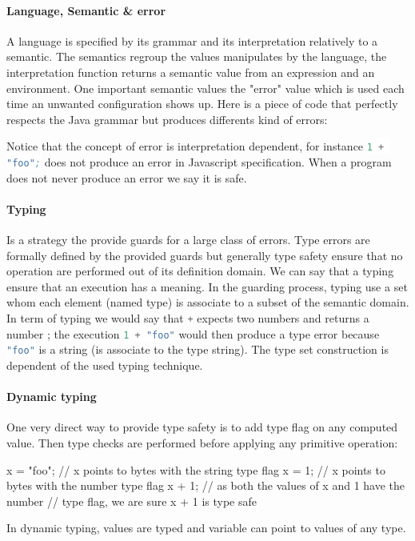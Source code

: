 \documentclass[a4paper]{report}
\newcommand{\icode}[1]{\colorbox{white}{\lstinline[language=scheme]&#1&}} %
\begin{document}
\paragraph{Language, Semantic \& error} A language is specified by its grammar and its interpretation relatively to a semantic. The semantics regroup the values manipulates by the language, the interpretation function returns a semantic value from an expression and an environment. One important semantic values the "error" value which is used each time an unwanted configuration shows up. Here is a piece of code that perfectly respects the Java grammar but produces differents kind of errors:

Notice that the concept of error is interpretation dependent, for instance \icode{1 + "foo";} does not produce an error in Javascript specification. When a program does not never produce an error we say it is safe.

\paragraph{Typing} Is a strategy the provide guards for a large class of errors. Type errors are formally defined by the provided guards but generally type safety ensure that no operation are performed out of its definition domain. We can say that a typing ensure that an execution has a meaning. In the guarding process, typing use a set whom each element (named type) is associate to a subset of the semantic domain. In term of typing we would say that \icode{+} expects two numbers and returns a number ; the execution \icode{1 + "foo"} would then produce a type error because \icode{"foo"} is a string (is associate to the type string). The type set construction is dependent of the used typing technique.

\paragraph{Dynamic typing} One very direct way to provide type safety is to add type flag on any computed value. Then type checks are performed before applying any primitive operation:
\begin{code}
x = "foo"; // x points to bytes with the string type flag
x = 1;     // x points to bytes with the number type flag
x + 1;     // as both the values of x and 1 have the number
           // type flag, we are sure x + 1 is type safe
\end{code}
In dynamic typing, values are typed and variable can point to values of any type.
\end{document}
